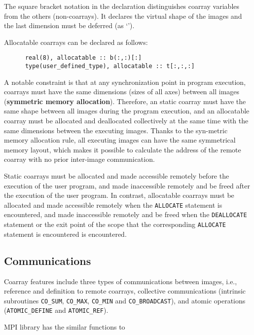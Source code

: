 The square bracket notation in the declaration distinguishes coarray variables from 
the others (non-coarrays). It declares the virtual shape of the images and the last 
dimension must be deferred (as `{\tt *}').

Allocatable coarrays can be declared as follows:
\begin{verbatim}
      real(8), allocatable :: b(:,:)[:]
      type(user_defined_type), allocatable :: t[:,:,:]
\end{verbatim}


A notable constraint is that at any synchronization point in program execution, 
coarrays must have the same dimensions (sizes of all axes) between all images
({\bf symmetric memory allocation}). 
Therefore, an static coarray must have the same shape between all images during 
the program execution, and an allocatable coarray must be allocated and deallocated 
collectively at the same time with the same dimensions between the executing images.
Thanks to the syn-metric memory allocation rule, all executing images can have
the same symmetrical memory layout, which makes it possible to calculate the address 
of the remote coarray with no prior inter-image communication.

\requirement
Static coarrays must be allocated and made accessible remotely
before the execution of the user program, and 
made inaccessible remotely and be freed after the execution of the user program.
In contrast, 
allocatable coarrays must be allocated and made accessible remotely
when the {\tt ALLOCATE} statement is encountered, and 
made inaccessible remotely and be freed when the {\tt DEALLOCATE} statement or 
the exit point of the scope that the corresponding {\tt ALLOCATE} statement is encountered 
is encountered.


\subsection{Communications}\label{sec:spec-comm}

Coarray features include three types of communications between images, i.e.,
reference and definition to remote coarrays,
collective communications (intrinsic subroutines {\tt CO\_SUM}, {\tt CO\_MAX}, 
{\tt CO\_MIN} and {\tt CO\_BROADCAST}), and
atomic operations ({\tt ATOMIC\_DEFINE} and {\tt ATOMIC\_REF}).

MPI library has the similar functions to 

